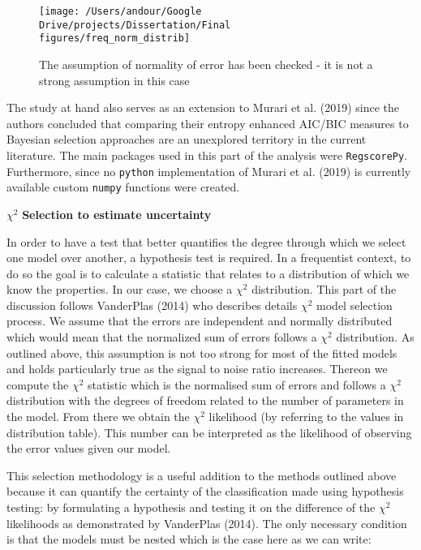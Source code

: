 \documentclass[12pt,]{article}
\begin{document}
\begin{figure}

{\centering \texttt{[image: /Users/andour/Google Drive/projects/Dissertation/Final figures/freq\_norm\_distrib]} 

}

\caption{The assumption of normality of error has been checked - it is not a strong assumption in this case}\label{fig:disterror}
\end{figure}

The study at hand also serves as an extension to Murari et al. (2019) since the authors concluded that comparing their entropy enhanced AIC/BIC measures to Bayesian selection approaches are an unexplored territory in the current literature. The main packages used in this part of the analysis were \texttt{RegscorePy}. Furthermore, since no \texttt{python} implementation of Murari et al. (2019) is currently available custom \texttt{numpy} functions were created.

\(\chi^2\) \textbf{Selection to estimate uncertainty}

In order to have a test that better quantifies the degree through which we select one model over another, a hypothesis test is required. In a frequentist context, to do so the goal is to calculate a statistic that relates to a distribution of which we know the properties. In our case, we choose a \(\chi^2\) distribution. This part of the discussion follows VanderPlas (2014) who describes details \(\chi^2\) model selection process.
We assume that the errors are independent and normally distributed which would mean that the normalized sum of errors follows a \(\chi^2\) distribution. As outlined above, this assumption is not too strong for most of the fitted models and holds particularly true as the signal to noise ratio increases. Thereon we compute the \(\chi^2\) statistic which is the normalised sum of errors and follows a \(\chi^2\) distribution with the degrees of freedom related to the number of parameters in the model. From there we obtain the \(\chi^2\) likelihood (by referring to the values in distribution table). This number can be interpreted as the likelihood of observing the error values given our model.

This selection methodology is a useful addition to the methods outlined above because it can quantify the certainty of the classification made using hypothesis testing: by formulating a hypothesis and testing it on the difference of the \(\chi^2\) likelihoods as demonstrated by VanderPlas (2014). The only necessary condition is that the models must be nested which is the case here as we can write:
\end{document}
